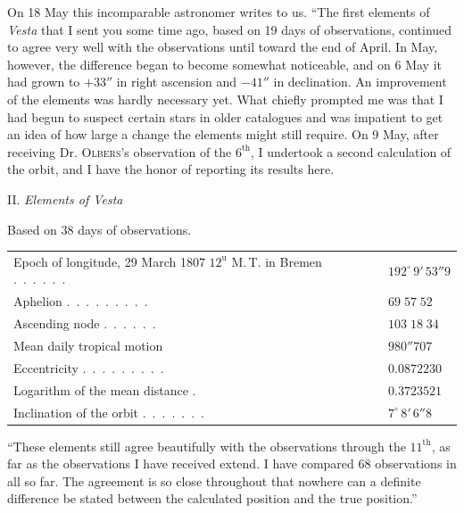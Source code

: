 \par\indent On 18 May this incomparable astronomer writes to us. “The first elements of \emph{Vesta} that I sent you some time ago, based on 19 days of observations, continued to agree very well with the observations until toward the end of April. In May, however, the difference began to become somewhat noticeable, and on 6 May it had grown to $+33''$ in right ascension and $-41''$ in declination. An improvement of the elements was hardly necessary yet. What chiefly prompted me was that I had begun to suspect certain stars in older catalogues and was impatient to get an idea of how large a change the elements might still require. On 9 May, after receiving Dr. \textsc{Olbers}’s observation of the $6^{\text{th}}$, I undertook a second calculation of the orbit, and I have the honor of reporting its results here.

\begin{center}
II. \emph{Elements of Vesta}
\end{center}

\begin{center}
Based on 38 days of observations.
\end{center}

\begin{center}\begingroup\fontsize{9}{11}\selectfont
\begin{tabular}{ll}
\shortstack[l]{Epoch of longitude, 29 March 1807 $12^{\text{u}}$\\M.\,T. in Bremen} .\ .\ .\ .\ .\ . & $192^\circ\,9'\,53''9$ \\
Aphelion .\ .\ .\ .\ .\ .\ .\ .\ . & $69\;57\;52$ \\
Ascending node .\ .\ .\ .\ .\ . & $103\;18\;34$ \\
Mean daily tropical motion  & $980''707$ \\
Eccentricity .\ .\ .\ .\ .\ .\ .\ .\ . & $0.0872230$ \\
Logarithm of the mean distance . & $0.3723521$ \\
Inclination of the orbit .\ .\ .\ .\ .\ .\ . & $7^\circ\,8'\,6''8$
\end{tabular}\endgroup\end{center}

\par\indent “These elements still agree beautifully with the observations through the $11^{\text{th}}$, as far as the observations I have received extend. I have compared 68 observations in all so far. The agreement is so close throughout that nowhere can a definite difference be stated between the calculated position and the true position.”

